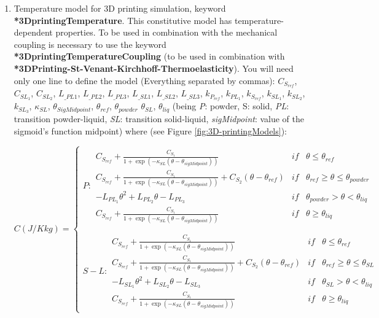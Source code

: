 \documentclass[oneside,11pt,times]{book}
\begin{document}
\begin{enumerate}
\item Temperature model for 3D printing simulation, keyword \textbf{*3DprintingTemperature}. This constitutive model has temperature-dependent properties. To be used in combination with the  mechanical coupling is necessary to use the keyword \textbf{*3DprintingTemperatureCoupling} (to be used in combination with \textbf{*3DPrinting-St-Venant-Kirchhoff-Thermoelasticity}). You will need only one line to define the model (Everything separated by commas): $C_{S_{ref}}$,
$C_{SL_1}$, $C_{SL_2}$, $L_{\_PL1}$, $L_{\_PL2}$, $L_{\_PL3}$, $L_{\_SL1}$, $L_{\_SL2}$, $L_{\_SL3}$, $k_{P_{ref}}$, $k_{PL_1}$, $k_{S_{ref}}$, $k_{SL_1}$, $k_{SL_2}$, $k_{SL_3}$, $\kappa_{SL}$, $\theta_{SigMidpoint}$, $\theta_{ref}$, $\theta_{powder}$ $\theta_{SL}$, $\theta_{liq}$ (being \textit{P}: powder, S: solid, \textit{PL}: transition powder-liquid, \textit{SL}: transition solid-liquid, \textit{sigMidpoint}: value of the sigmoid's function midpoint)
where (see Figure \ref{fig:3D-printingModels}):

 \begin{equation*}
    C (J/Kkg)=\left\{ \begin{array}{lcc} P:
    \begin{array}{lcc}
    C_{S_{ref}}+ \frac{C_{S_1}}{1 +\exp(-\kappa_{SL} (\theta -\theta_{sigMidpoint}))} & if & \theta\leq \theta_{ref}\\
    C_{S_{ref}}+ \frac{C_{S_1}}{1 +\exp(-\kappa_{SL} (\theta -\theta_{sigMidpoint}))} + C_{S_2} (\theta - \theta_{ref})  & if & \theta_{ref}\geq \theta\leq\theta_{powder}\\
    -L_{PL_1} \theta^2 + L_{PL_2} \theta -L_{PL_3}  & if & \theta_{powder}> \theta < \theta_{liq} \\
    C_{S_{ref}}+ \frac{C_{S_1} }{1 +\exp(-\kappa_{SL} (\theta -\theta_{sigMidpoint}))} & if & \theta\geq \theta_{liq}
     \end{array}\\ \\
     S-L:\begin{array}{lcc}
    C_{S_{ref}}+ \frac{C_{S_1}}{1 +\exp(-\kappa_{SL} (\theta -\theta_{sigMidpoint}))} & if & \theta\leq \theta_{ref}\\
    C_{S_{ref}}+ \frac{C_{S_1} }{1 +\exp(-\kappa_{SL}  (\theta -\theta_{sigMidpoint}))} + C_{S_2} (\theta - \theta_{ref})  & if & \theta_{ref}\geq \theta\leq\theta_{SL}\\
    -L_{SL_1} \theta^2 + L_{SL_2}  \theta -L_{SL_3}  & if & \theta_{SL}> \theta <\theta_{liq} \\
    C_{S_{ref}}+\frac{C_{S_1} }{1 +\exp(-\kappa_{SL} (\theta -\theta_{sigMidpoint}))} & if & \theta\geq \theta_{liq}
    \end{array}
    \end{array}
    \right.
    \end{equation*}
    

\end{enumerate}
\end{document}
